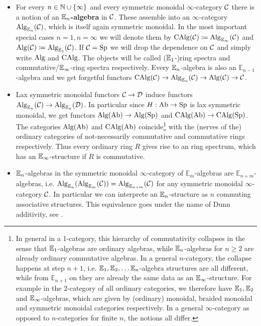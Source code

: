 \begin{itemize}
    \item For every $n\in\mathbb{N}\cup\{\infty\}$ and every symmetric monoidal $\infty$-category $\mathcal{C}$ there is a notion of an \textbf{$\mathbb{E}_n$-algebra} in $\mathcal{C}$. 
    These assemble into an $\infty$-category $\operatorname{Alg}_{\mathbb{E}_n}(\mathcal{C})$, which is itself again symmetric monoidal. 
    In the most important special cases $n=1,n=\infty$ we will denote them by $\operatorname{CAlg}(\mathcal{C})\coloneqq \operatorname{Alg}_{\mathbb{E}_\infty}(\mathcal{C})$ and $\operatorname{Alg}(\mathcal{C})\coloneqq \operatorname{Alg}_{\mathbb{E}_1}(\mathcal{C})$. If $\mathcal{C}=\operatorname{Sp}$ we will drop the dependence on $\mathcal{C}$ and simply write $\operatorname{Alg}$ and $\operatorname{CAlg}$. The objects will be called ($\mathbb{E}_1$-)ring spectra and commutative/$\mathbb{E}_\infty$-ring spectra respectively.
    Every $\mathbb{E}_n$-algebra is also an $\mathbb{E}_{n-1}$-algebra and we get forgetful functors $\operatorname{CAlg}(\mathcal{C})\rightarrow \operatorname{Alg}_{\mathbb{E}_n}(\mathcal{C})\rightarrow \operatorname{Alg}(\mathcal{C})\rightarrow \mathcal{C}$. 
    \item Lax symmetric monoidal functors $\mathcal{C}\rightarrow\mathcal{D}$ induce functors $\operatorname{Alg}_{\mathbb{E}_n}(\mathcal{C})\rightarrow \operatorname{Alg}_{\mathbb{E}_n}(\mathcal{D})$. In particular since $H:\operatorname{Ab}\rightarrow\operatorname{Sp}$ is lax symmetric monoidal, we get functors $\operatorname{Alg}(\operatorname{Ab})\rightarrow \operatorname{Alg}(\operatorname{Sp})$ and  $\operatorname{CAlg}(\operatorname{Ab})\rightarrow \operatorname{CAlg}(\operatorname{Sp})$. The categories $\operatorname{Alg}(\operatorname{Ab})$ and $\operatorname{CAlg}(\operatorname{Ab})$ coincide\footnote{In general in a 1-category, this hierarchy of commutativity collapses in the sense that $\mathbb{E}_1$-algebras are ordinary algebras, while $\mathbb{E}_n$-algebras for $n\geq 2$ are already ordinary commutative algebras.
    In a general $n$-category, the collapse happens at step $n+1$, i.e. $\mathbb{E}_1,\mathbb{E}_2,\dots \mathbb{E}_n$-algebra structures are all different, while from $\mathbb{E}_{n+1}$ on they are already the same data as an $\mathbb{E}_\infty$-structure. For example in the 2-category of all ordinary categories, we therefore have $\mathbb{E}_1,\mathbb{E}_2$ and $\mathbb{E}_\infty$-algebras, which are given by (ordinary) monoidal, braided monoidal and symmetric monoidal categories respectively. In a general $\infty$-category as opposed to $n$-categories for finite $n$, the notions all differ.} with the (nerves of the) ordinary categories of not-necessarily commutative and commutative rings respectively. Thus every ordinary ring $R$ gives rise to an ring spectrum, which has an $\mathbb{E}_\infty$-structure if $R$ is commutative.
    \item $\mathbb{E}_n$-algebras in the symmetric monoidal $\infty$-category of $\mathbb{E}_m$-algebras are $\mathbb{E}_{n+m}$-algebras, i.e. $\operatorname{Alg}_{\mathbb{E}_n}(\operatorname{Alg}_{\mathbb{E}_m}(\mathcal{C}))=\operatorname{Alg}_{\mathbb{E}_{n+m}}(\mathcal{C})$ for any symmetric monoidal $\infty$-category $\mathcal{C}$. In particular we can interprete an $\mathbb{E}_n$-structure as $n$ commuting associative structures. This equivalence goes under the name of Dunn additivity, see \cite[Theorem~5.1.2.2]{lurie2017higher}.

\end{itemize}
